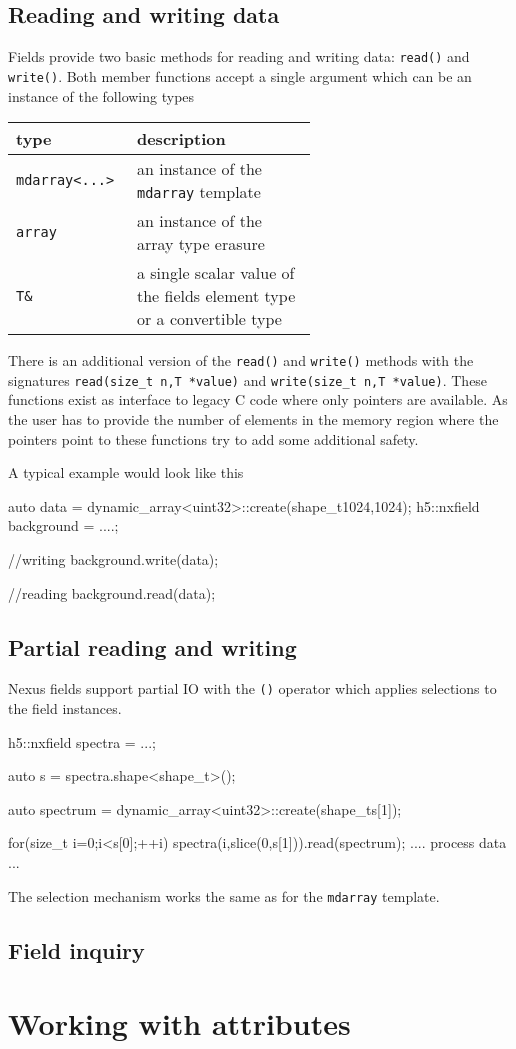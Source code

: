 \subsection{Reading and writing data}

Fields provide two basic methods for reading and writing data: {\tt read()} and 
{\tt write()}. 
Both member functions accept a single argument which can be an instance of the
following types
\begin{center}
    \begin{tabular}{l|p{0.6\linewidth}}
        {\bf type} & {\bf description} \\
        \hline
        \hline
        {\tt mdarray<...>} & an instance of the {\tt mdarray} template \\
        \hline
        {\tt array} & an instance of the array type erasure \\
        \hline
        {\tt T\& } & a single scalar value of the fields element type or a 
        convertible type \\
        \hline
    \end{tabular}
\end{center}
There is an additional version of the {\tt read()} and {\tt write()} methods
with the signatures {\tt read(size\_t n,T *value)}
and {\tt write(size\_t n,T *value)}. These functions exist as interface to
legacy C code where only pointers are available. As the user has to provide the
number of elements in the memory region where the pointers point to these
functions try to add some additional safety.

A typical example would look like this
\begin{cppcode}
auto data = dynamic_array<uint32>::create(shape_t{1024,1024});
h5::nxfield background = ....;

//writing
background.write(data);

//reading
background.read(data);
\end{cppcode}

\subsection{Partial reading and writing}

Nexus fields support partial IO with the {\tt ()} operator which applies
selections to the field instances. 
\begin{cppcode}
h5::nxfield spectra = ...;

auto s = spectra.shape<shape_t>();

auto spectrum = dynamic_array<uint32>::create(shape_t{s[1]});

for(size_t i=0;i<s[0];++i)
{
    spectra(i,slice(0,s[1])).read(spectrum);
    .... process data ...
}
\end{cppcode}
The selection mechanism works the same as for the {\tt mdarray} template. 

\subsection{Field inquiry}

\section{Working with attributes}



